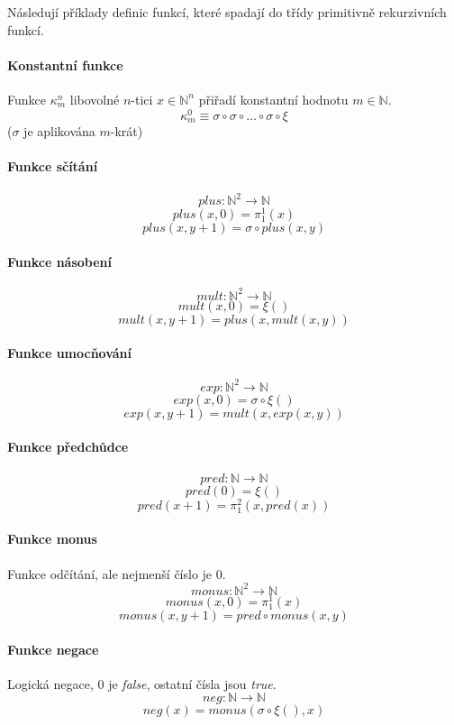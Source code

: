 \noindent Následují příklady definic funkcí, které spadají do třídy primitivně rekurzivních funkcí.

\paragraph*{Konstantní funkce} Funkce $\kappa_m^n$ libovolné $n$-tici $x \in \mathbb{N}^n$ přiřadí konstantní hodnotu $m \in \mathbb{N}$.
$$ \kappa_m^0 \equiv \sigma \circ \sigma \circ \ldots \circ \sigma \circ \xi $$
($\sigma$ je aplikována $m$-krát)

\paragraph*{Funkce sčítání}
$$ plus : \mathbb{N}^2 \rightarrow \mathbb{N} $$
$$ plus(x, 0) = \pi_1^1 (x)$$
$$ plus(x, y + 1) = \sigma \circ plus(x, y) $$

\paragraph*{Funkce násobení}
$$ mult : \mathbb{N}^2 \rightarrow \mathbb{N} $$
$$ mult(x, 0) = \xi()$$
$$ mult(x, y + 1) = plus(x, mult(x, y)) $$

\paragraph*{Funkce umocňování}
$$ exp : \mathbb{N}^2 \rightarrow \mathbb{N} $$
$$ exp(x, 0) = \sigma \circ \xi()$$
$$ exp(x, y + 1) = mult(x, exp(x, y)) $$

\paragraph*{Funkce předchůdce}
$$ pred : \mathbb{N} \rightarrow \mathbb{N} $$
$$ pred(0) = \xi() $$
$$ pred(x + 1) = \pi_1^2(x, pred(x)) $$

\paragraph*{Funkce monus} Funkce odčítání, ale nejmenší číslo je $0$.
$$ monus : \mathbb{N}^2 \rightarrow \mathbb{N} $$
$$ monus(x, 0) = \pi_1^1 (x) $$
$$ monus(x, y + 1) = pred \circ monus(x, y) $$

\paragraph*{Funkce negace} Logická negace, $0$ je \textit{false}, ostatní čísla jsou \textit{true}.
$$ neg : \mathbb{N} \rightarrow \mathbb{N} $$
$$ neg(x) = monus (\sigma \circ \xi(), x) $$

